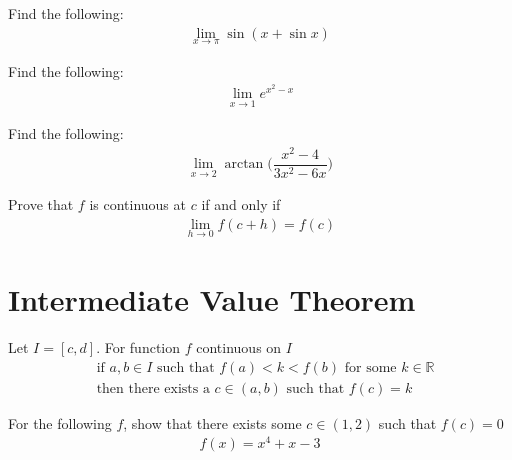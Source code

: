 \begin{exercise}
Find the following:
\begin{align*}
    \lim_{x \longrightarrow \pi} \sin (x + \sin x)
\end{align*}
\end{exercise}

\begin{exercise}
Find the following:
\begin{align*}
    \lim_{x \longrightarrow 1} e^{x^{2}-x}
\end{align*}
\end{exercise}

\begin{exercise}
Find the following:
\begin{align*}
    \lim_{x \longrightarrow 2} \arctan \Big( \dfrac{x^{2}-4}{3x^{2}-6x} \Big)
\end{align*}
\end{exercise}

\begin{exercise}
Prove that $f$ is continuous at $c$ if and only if
\begin{align*}
    \lim_{h \longrightarrow 0} f(c + h) = f(c)
\end{align*}
\end{exercise}

\newpage
\section{Intermediate Value Theorem}

\begin{theorem}
Let $I = [c, d]$. For function $f$ continuous on $I$
\begin{align*}
    &\text{if} \hspace{4pt} a, b \in I \hspace{4pt} \text{such that} \hspace{4pt} f(a)<k<f(b) \hspace{4pt} \text{for some} \hspace{4pt} k \in \mathbb{R}\\[2ex]
    &\text{then there exists a} \hspace{4pt} c \in (a, b) \hspace{4pt} \text{such that} \hspace{4pt} f(c) = k 
\end{align*}
\end{theorem}

\begin{exercise}
For the following $f$, show that there exists some $c \in (1, 2)$ such that $f(c)=0$
\begin{align*}
    f(x) = x^{4} + x - 3
\end{align*}
\end{exercise}

